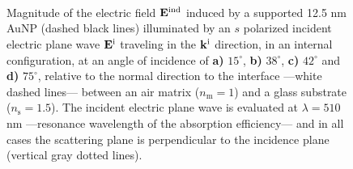 \begin{figure}[t!]\centering
   \def\svgwidth{.75\textwidth}
   \footnotesize
   \\[-32.6em]
   \hspace*{-.25\textwidth}
       \begin{subfigure}{.25\textwidth}\textcolor{red}{\caption{ } \label{sfig:Near:SuppObl:s:15}}\end{subfigure}%
       \begin{subfigure}{.34\textwidth}\caption{ }\label{sfig:Near:SuppObl:s:38}\end{subfigure}\\[13em]
    \hspace*{-.25\textwidth}
       \begin{subfigure}{.25\textwidth}\textcolor{red}{\caption{ } \label{sfig:Near:SuppObl:s:42}}\end{subfigure}%
       \begin{subfigure}{.34\textwidth}\caption{ }\label{sfig:Near:SuppObl:s:75}\end{subfigure}\\[15em]
\caption[Induced Electric Field of a 12.5 nm Au NP on substrate illuminated at oblique incidence with a $s$ polarized electric field]{%
Magnitude of the electric field $\vb{E}^\text{ind}$ induced by a supported 12.5 nm AuNP (dashed black lines) illuminated by an $s$ polarized incident electric plane wave $\vb{E}^\text{i}$ traveling in the $\vb{k}^\text{i}$ direction, in an internal configuration, at an angle of incidence of \textbf{a)} $15^\circ$, \textbf{b)} $38^\circ$, \textbf{c)} $42^\circ$ and \textbf{d)} $75^\circ$, relative to the normal direction to the interface ---white dashed lines--- between an air matrix ($n_\text{m} = 1$) and a glass substrate ($n_\text{s} = 1.5$). The incident electric plane wave is evaluated at $\lambda = 510$ nm ---resonance wavelength of the absorption efficiency--- and in all cases the scattering plane is perpendicular to the incidence plane (vertical gray dotted lines).
}
 \label{fig:Near:SuppObl:s}
 \end{figure}


